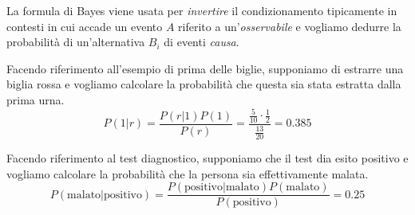 La formula di Bayes viene usata per \emph{invertire} il condizionamento tipicamente in contesti
in cui accade un evento $A$ riferito a un'\emph{osservabile} e vogliamo dedurre la probabilità di
un'alternativa $B_i$ di eventi \emph{causa}.

\begin{example}
	Facendo riferimento all'esempio di prima delle biglie, supponiamo di estrarre una biglia
	rossa e vogliamo calcolare la probabilità che questa sia stata estratta dalla prima urna.
	\[
		P(1 | r) = \frac{P(r | 1) P(1)}{P(r)} =
		\frac{\frac{5}{10} \cdot \frac{1}{2}}{\frac{13}{20}} = 0.385
	\]
\end{example}

\begin{example}
	Facendo riferimento al test diagnostico, supponiamo che il test dia esito positivo e vogliamo
	calcolare la probabilità che la persona sia effettivamente malata.
	\[
		P(\text{malato} | \text{positivo}) =
		\frac{P(\text{positivo} | \text{malato}) P(\text{malato})}{P(\text{positivo})} = 0.25
	\]
\end{example}
